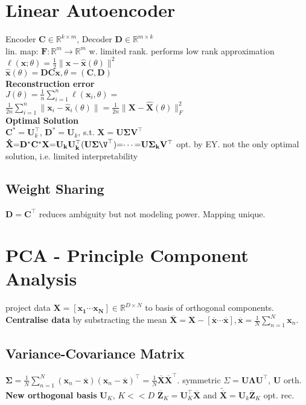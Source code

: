 \section*{Linear Autoencoder}
Encoder $\mathbf{C}{\in}\mathbb{R}^{k\times m}$,
Decoder $\mathbf{D}{\in}\mathbb{R}^{m\times k}$\\
lin. map: $\mathbf{F}: \mathbb{R}^m{\rightarrow}\mathbb{R}^m$ w. limited rank.
performs low rank approximation
$\ell(\mathbf{x};\theta){=}\frac{1}{2}\|\mathbf{x}{-}\mathbf{\hat{x}}(\theta)\|^2$\\
$\mathbf{\hat{x}}(\theta){=}\mathbf{DCx},\theta{=}(\mathbf{C},\mathbf{D})$\\
\textbf{Reconstruction error}\\ $J(\theta)=\frac{1}{n}\sum_{i=1}^n\ell(\mathbf{x}_i,\theta)=$\\
$\frac{1}{2n}\sum_{i=1}^n\|\mathbf{x}_i-\mathbf{\hat{x}}_i(\theta)\|=\frac{1}{2n}\|\mathbf{X}-\mathbf{\hat{X}}(\theta)\|_F^2$\\
\textbf{Optimal Solution}\\
$\mathbf{C}^*{=}\mathbf{U}_k^\top$, $\mathbf{D}^*{=}\mathbf{U}_k$, s.t. $\mathbf{X}{=}\mathbf{U\Sigma V^\top}$\\
$\mathbf{\hat{X}}{=}\mathbf{D^*C^*X}{=}\mathbf{U_k U_k^\top}(\mathbf{U\Sigma \V^\top}){=}\dotsi{=}\mathbf{U\Sigma_k V^\top}$ opt. by EY.
not the only optimal solution, i.e. limited interpretability
\subsection*{Weight Sharing}
$\mathbf{D{=}C^\top}$ reduces ambiguity but not modeling power. Mapping unique.

\section*{PCA - Principle Component Analysis}
project data $\mathbf{X}{=}[\mathbf{x_1}\dotsi\mathbf{x_N}]{\in}\mathbb{R}^{D \times N}$ to basis of orthogonal components. \\
\textbf{Centralise data} by substracting the mean $\overline{\mathbf{X}}{=}\mathbf{X}{-}[\overline{\mathbf{x}}\dotsi\overline{\mathbf{x}}], \overline{\mathbf{x}}{=}\frac{1}{N} \sum_{n=1}^N \mathbf{x}_n$.
\subsection*{Variance-Covariance Matrix}
$\mathbf{\Sigma}{=}\frac{1}{N} \sum_{n=1}^N (\mathbf{x}_n{-}\overline{\mathbf{x}}) (\mathbf{x}_n{-}\overline{\mathbf{x}})^\top{=}\frac{1}{N} \overline{\mathbf{X}}\overline{\mathbf{X}}^\top$.
 symmetric $\Sigma{=}\mathbf{U \Lambda U}^\top$, $\mathbf{U}$ orth.\\
\textbf{New orthogonal basis} $\mathbf{U}_K$, $K{<<}D$
$\overline{\mathbf{Z}}_K{=}\mathbf{U}_K^\top \overline{\mathbf{X}}$ and $\tilde{\overline{\mathbf{X}}}{=}\mathbf{U}_k \overline{\mathbf{Z}}_K$ opt. rec.


